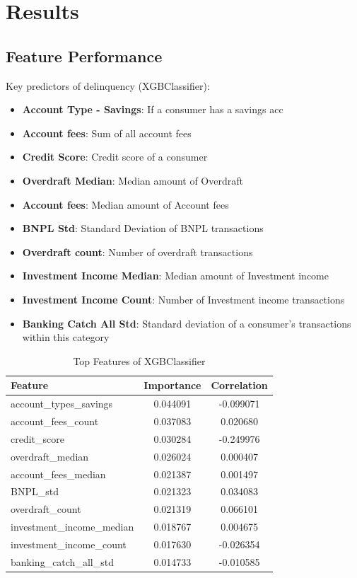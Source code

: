 \documentclass[12pt,letterpaper]{article}
\begin{document}
\section{Results}

\subsection{Feature Performance}
Key predictors of delinquency (XGBClassifier):
\begin{itemize}
    \item \textbf{Account Type - Savings}: If a consumer has a savings acc
    \item \textbf{Account fees}: Sum of all account fees
    \item \textbf{Credit Score}: Credit score of a consumer
    \item \textbf{Overdraft Median}: Median amount of Overdraft
    \item \textbf{Account fees}: Median amount of Account fees
    \item \textbf{BNPL Std}: Standard Deviation of BNPL transactions
    \item \textbf{Overdraft count}: Number of overdraft transactions
    \item \textbf{Investment Income Median}: Median amount of Investment income
    \item \textbf{Investment Income Count}: Number of Investment income transactions
    \item \textbf{Banking Catch All Std}: Standard deviation of a consumer's transactions within this category
\end{itemize}

\begin{table}[H]
    \centering
    \begin{tabular}{|l|c|c|}
        \hline
        Feature & Importance & Correlation \\
        \hline
        account\_types\_savings & 0.044091 & -0.099071 \\
        account\_fees\_count & 0.037083 & 0.020680 \\
        credit\_score & 0.030284 & -0.249976 \\
        overdraft\_median & 0.026024 & 0.000407 \\
        account\_fees\_median & 0.021387 & 0.001497 \\
        BNPL\_std & 0.021323 & 0.034083 \\
        overdraft\_count & 0.021319 & 0.066101 \\
        investment\_income\_median & 0.018767 & 0.004675 \\
        investment\_income\_count & 0.017630 & -0.026354 \\
        banking\_catch\_all\_std & 0.014733 & -0.010585 \\
        \hline
    \end{tabular}
    \caption{Top Features of XGBClassifier}
    \label{tab:top_features_xgb}
\end{table}
\end{document}

